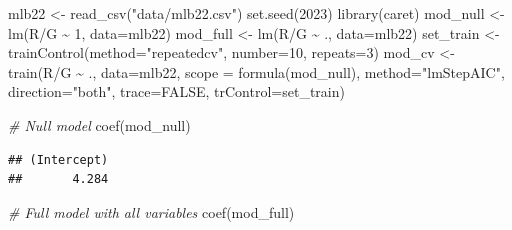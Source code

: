 \documentclass[
  11pt,
]{book}
\newenvironment{Shaded}{\begin{snugshade}}{\end{snugshade}}
\newcommand{\AttributeTok}[1]{\textcolor[rgb]{0.77,0.63,0.00}{#1}}
\newcommand{\CommentTok}[1]{\textcolor[rgb]{0.56,0.35,0.01}{\textit{#1}}}
\newcommand{\ConstantTok}[1]{\textcolor[rgb]{0.00,0.00,0.00}{#1}}
\newcommand{\DecValTok}[1]{\textcolor[rgb]{0.00,0.00,0.81}{#1}}
\newcommand{\FunctionTok}[1]{\textcolor[rgb]{0.00,0.00,0.00}{#1}}
\newcommand{\NormalTok}[1]{#1}
\newcommand{\OtherTok}[1]{\textcolor[rgb]{0.56,0.35,0.01}{#1}}
\newcommand{\SpecialCharTok}[1]{\textcolor[rgb]{0.00,0.00,0.00}{#1}}
\newcommand{\StringTok}[1]{\textcolor[rgb]{0.31,0.60,0.02}{#1}}
\theoremstyle{definition}
\theoremstyle{definition}
\theoremstyle{definition}
\theoremstyle{definition}
\theoremstyle{remark}
\begin{document}
\begin{Shaded}
\begin{Highlighting}[]
\NormalTok{mlb22 }\OtherTok{\textless{}{-}} \FunctionTok{read\_csv}\NormalTok{(}\StringTok{"data/mlb22.csv"}\NormalTok{)}
\FunctionTok{set.seed}\NormalTok{(}\DecValTok{2023}\NormalTok{)}
\FunctionTok{library}\NormalTok{(caret)}
\NormalTok{mod\_null }\OtherTok{\textless{}{-}} \FunctionTok{lm}\NormalTok{(}\StringTok{\textasciigrave{}}\AttributeTok{R/G}\StringTok{\textasciigrave{}} \SpecialCharTok{\textasciitilde{}} \DecValTok{1}\NormalTok{, }\AttributeTok{data=}\NormalTok{mlb22)}
\NormalTok{mod\_full }\OtherTok{\textless{}{-}} \FunctionTok{lm}\NormalTok{(}\StringTok{\textasciigrave{}}\AttributeTok{R/G}\StringTok{\textasciigrave{}} \SpecialCharTok{\textasciitilde{}}\NormalTok{ ., }\AttributeTok{data=}\NormalTok{mlb22)}
\NormalTok{set\_train }\OtherTok{\textless{}{-}} \FunctionTok{trainControl}\NormalTok{(}\AttributeTok{method=}\StringTok{"repeatedcv"}\NormalTok{, }\AttributeTok{number=}\DecValTok{10}\NormalTok{, }\AttributeTok{repeats=}\DecValTok{3}\NormalTok{)}
\NormalTok{mod\_cv }\OtherTok{\textless{}{-}} \FunctionTok{train}\NormalTok{(}\StringTok{\textasciigrave{}}\AttributeTok{R/G}\StringTok{\textasciigrave{}} \SpecialCharTok{\textasciitilde{}}\NormalTok{ ., }\AttributeTok{data=}\NormalTok{mlb22,  }\AttributeTok{scope =} \FunctionTok{formula}\NormalTok{(mod\_null),}
  \AttributeTok{method=}\StringTok{"lmStepAIC"}\NormalTok{, }\AttributeTok{direction=}\StringTok{"both"}\NormalTok{, }\AttributeTok{trace=}\ConstantTok{FALSE}\NormalTok{, }\AttributeTok{trControl=}\NormalTok{set\_train)}
\end{Highlighting}
\end{Shaded}

\begin{Shaded}
\begin{Highlighting}[]
\CommentTok{\# Null model}
\FunctionTok{coef}\NormalTok{(mod\_null)}
\end{Highlighting}
\end{Shaded}

\begin{verbatim}
## (Intercept) 
##       4.284
\end{verbatim}

\begin{Shaded}
\begin{Highlighting}[]
\CommentTok{\# Full model with all variables}
\FunctionTok{coef}\NormalTok{(mod\_full)}
\end{Highlighting}
\end{Shaded}
\end{document}
